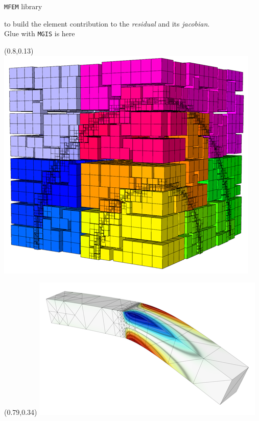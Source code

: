 \documentclass{beamer}
\begin{document}
\begin{frame}[fragile]{\texttt{MFEM} library}
\begin{itemize}
\begin{itemize}
    to build the element contribution to the \emph{residual} and its
    \emph{jacobian}.\\
    \hspace*{0.333em}\hspace*{0.333em}Glue with \texttt{MGIS} is here
  \end{itemize}
\end{itemize}
\begin{textblock}{.15}(0.8,0.13)
    \includegraphics[width=\textwidth]{img/amr1.png}
\end{textblock}
\begin{textblock}{.19}(0.79,0.34)
    \includegraphics[width=\textwidth]{img/ex21.png}
\end{textblock}
\end{frame}
\end{document}
